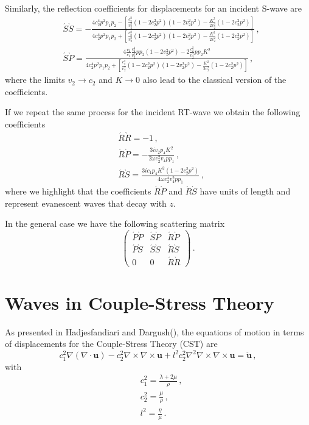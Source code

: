\documentclass[12pt]{article}
\begin{document}
Similarly, the reflection coefficients for displacements for an incident S-wave are
\begin{align}
&\acute{S}\grave{S} = -\frac{4c_2^4 p^2 p_1 p_2 -  \left[\frac{c_2^2}{v_2^2}(1 - 2c_2^2 p^2)(1 - 2v_2^2 p^2) - \frac{K^2}{2v_2^2}(1 - 2c_2^2 p^2)\right]} {4c_2^4 p^2 p_1 p_2 +  \left[\frac{c_2^2}{v_2^2}(1 - 2c_2^2 p^2)(1 - 2v_2^2 p^2) - \frac{K^2}{2v_2^2}(1 - 2c_2^2 p^2)\right]}\, ,\\
&\acute{S}\grave{P} = \frac{4 \frac{v_2}{c_1}\frac{c_2^4}{v_2^2} p p_2(1 - 2 v_2^2 p^2) -  2 \frac{c_2^2}{v_2^2} p p_2 K^2} {4c_2^4 p^2 p_1 p_2 +  \left[\frac{c_2^2}{v_2^2}(1 - 2c_2^2 p^2)(1 - 2v_2^2 p^2) - \frac{K^2}{2v_2^2}(1 - 2c_2^2 p^2)\right]}\, ,
\end{align}
where the limits \(v_2 \rightarrow c_2\) and \(K \rightarrow 0\) also lead to the classical version of the coefficients.

If we repeat the same process for the incident RT-wave we obtain the following coefficients
\begin{align}
&\acute{R}\grave{R} = -1\, ,\\
&\acute{R}\grave{P} = -\frac{3i v_2 p_4 K^2}{2 \omega c_2^2 v_4 p p_1}\, ,\\
&\acute{R}\grave{S} = \frac{3i c_1 p_4 K^2(1 - 2c_2^2 p^2)}{4 \omega c_2^4 v_4^2 p p_1}\, ,
\end{align}
where we highlight that the coefficients \(\acute{R}\grave{P}\) and \(\acute{R}\grave{S}\) have units of length and represent evanescent waves that decay with \(z\).

In the general case we have the following scattering matrix
\[\begin{pmatrix}
\acute{P}\grave{P} &\acute{S}\grave{P} &\acute{R}\grave{P}\\
\acute{P}\grave{S} &\acute{S}\grave{S} &\acute{R}\grave{S}\\
0 &0 &\acute{R}\grave{R}
\end{pmatrix}\, .\]


\section{Waves in Couple-Stress Theory}
As presented in Hadjesfandiari and Dargush(), the equations of motion in terms of displacements for the Couple-Stress Theory (CST) are
\[c_1^2 \nabla (\nabla \cdot \mathbf{u}) - c_2^2\nabla\times \nabla \times \mathbf{u} + l^2 c_2^2 \nabla^2 \nabla \times \nabla \times \mathbf{u} = \ddot{\mathbf{u}}\, ,\]
with
\begin{align*}
&c_1^2 = \frac{\lambda + 2\mu}{\rho}\, ,\\
&c_2^2 = \frac{\mu}{\rho}\, ,\\
&l^2 = \frac{\eta}{\mu}\, .
\end{align*}
\end{document}
